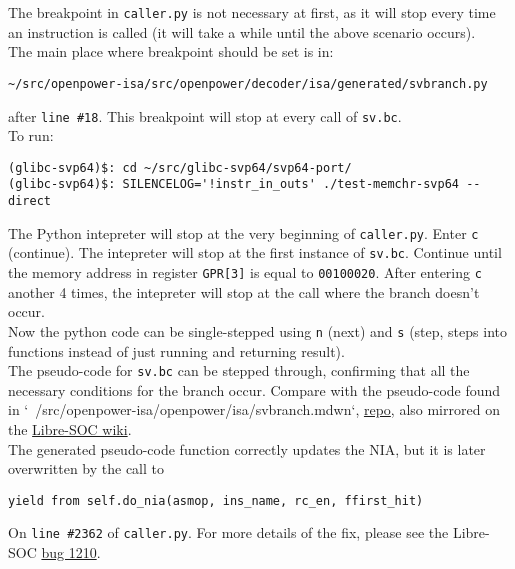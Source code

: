 The breakpoint in \texttt{caller.py} is not necessary at first, as it will
stop every time an instruction is called (it will take a while until the
above scenario occurs).\\

The main place where breakpoint should be set is in:

\begin{verbatim}
~/src/openpower-isa/src/openpower/decoder/isa/generated/svbranch.py
\end{verbatim}

after \texttt{line \#18}. This breakpoint will stop at
every call of \texttt{sv.bc}.\\

To run:
\begin{verbatim}
(glibc-svp64)$: cd ~/src/glibc-svp64/svp64-port/
(glibc-svp64)$: SILENCELOG='!instr_in_outs' ./test-memchr-svp64 --direct
\end{verbatim}

The Python intepreter will stop at the very beginning of \texttt{caller.py}.
Enter \texttt{c} (continue). The intepreter will stop at the first instance
of \texttt{sv.bc}. Continue until the memory address in register
\texttt{GPR[3]} is equal to \texttt{00100020}.
After entering \texttt{c} another 4 times, the intepreter will stop at the
call where the branch doesn't occur.\\

Now the python code can be single-stepped using \texttt{n} (next) and
\texttt{s} (step, steps into functions instead of just running
and returning result).\\

The pseudo-code for \texttt{sv.bc} can be stepped through,
confirming that all the necessary conditions for the branch occur.
Compare with the pseudo-code found in
`~/src/openpower-isa/openpower/isa/svbranch.mdwn`,
\href{https://git.libre-soc.org/?p=openpower-isa.git;a=blob;f=openpower/isa/svbranch.mdwn;h=e8b46e7700b44c6112ee2d873cc2e04b3c732370;hb=089e6d352ec57be4ab645d18ad9e95df3af0d365}{repo},
also mirrored on the
\href{https://libre-soc.org/openpower/isa/svbranch/}{Libre-SOC wiki}.\\

The generated pseudo-code function correctly updates the \acrfull{NIA},
but it is later overwritten by the call to 
\begin{verbatim}
yield from self.do_nia(asmop, ins_name, rc_en, ffirst_hit)
\end{verbatim}

On \texttt{line \#2362} of \texttt{caller.py}. For more details of the fix,
please see the Libre-SOC
\href{https://bugs.libre-soc.org/show_bug.cgi?id=1210}{bug 1210}.
